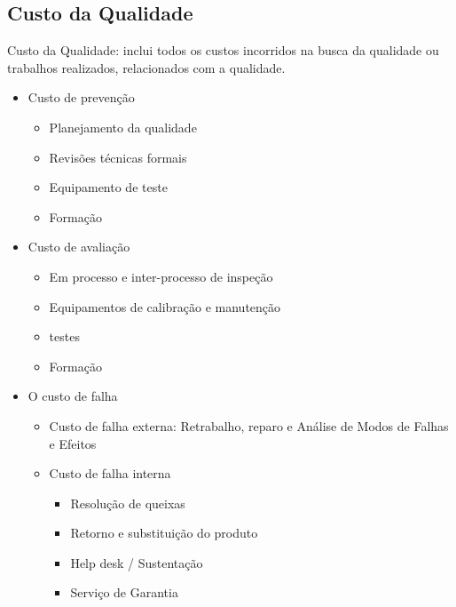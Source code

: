 \documentclass[12pt]{article}
\begin{document}
        \subsection{Custo da Qualidade}
        Custo da Qualidade: inclui todos os custos incorridos na busca da qualidade ou trabalhos realizados, relacionados com a qualidade. \\
        \begin{itemize}
            \item  Custo de prevenção
                \begin{itemize}
                    \item Planejamento da qualidade 
                    \item Revisões técnicas formais
                    \item Equipamento de teste 
                    \item Formação
                \end{itemize}
            \item  Custo de avaliação
                \begin{itemize}
                    \item Em processo e inter-processo de inspeção 
                    \item Equipamentos de calibração e manutenção 
                    \item testes 
                    \item Formação
                \end{itemize}
            \item  O custo de falha
                \begin{itemize}
                    \item Custo de falha externa: Retrabalho, reparo e Análise de Modos de Falhas e Efeitos
                    \item Custo de falha interna 
                    \begin{itemize}
                        \item Resolução de queixas
                        \item Retorno e substituição do produto
                        \item Help desk / Sustentação 
                        \item Serviço de Garantia 
                    \end{itemize}
                \end{itemize}
        \end{itemize}
\end{document}
